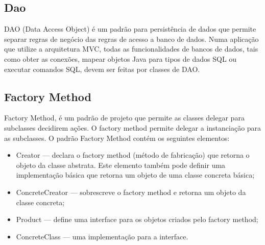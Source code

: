 \subsection{Dao}

DAO (Data Access Object) é um padrão para persistência de dados que permite separar regras de negócio das regras de acesso a banco de dados. Numa aplicação que utilize a arquitetura MVC, todas as funcionalidades de bancos de dados, tais como obter as conexões, mapear objetos Java para tipos de dados SQL ou executar comandos SQL, devem ser feitas por classes de DAO.

\subsection{Factory Method}

Factory Method, é um padrão de projeto que permite as classes delegar para subclasses decidirem ações. O factory method permite delegar a instanciação para as subclasses. O padrão Factory Method contém os seguintes elementos:

\begin{itemize}
	\item Creator — declara o factory method (método de fabricação) que retorna o objeto da classe abstrata. Este elemento também pode definir uma implementação básica que retorna um objeto de uma classe concreta básica;
	\item ConcreteCreator — sobrescreve o factory method e retorna um objeto da classe concreta;
	\item Product — define uma interface para os objetos criados pelo factory method;
	\item ConcreteClass — uma implementação para a interface.
\end{itemize}
